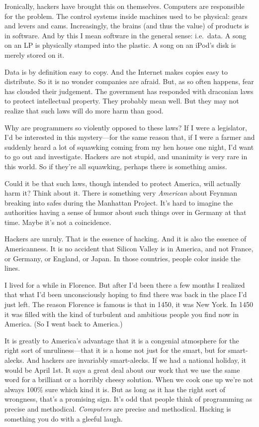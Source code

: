 Ironically, hackers have brought this on themselves. Computers are
responsible for the problem. The control systems inside machines used to
be physical: gears and levers and cams. Increasingly, the brains (and
thus the value) of products is in software. And by this I mean software
in the general sense: i.e.~data. A song on an LP is physically stamped
into the plastic. A song on an iPod's disk is merely stored on it.

Data is by definition easy to copy. And the Internet makes copies easy
to distribute. So it is no wonder companies are afraid. But, as so often
happens, fear has clouded their judgement. The government has responded
with draconian laws to protect intellectual property. They probably mean
well. But they may not realize that such laws will do more harm than
good.

Why are programmers so violently opposed to these laws? If I were a
legislator, I'd be interested in this mystery---for the same reason
that, if I were a farmer and suddenly heard a lot of squawking coming
from my hen house one night, I'd want to go out and investigate. Hackers
are not stupid, and unanimity is very rare in this world. So if they're
all squawking, perhaps there is something amiss.

Could it be that such laws, though intended to protect America, will
actually harm it? Think about it. There is something very
\emph{American} about Feynman breaking into safes during the Manhattan
Project. It's hard to imagine the authorities having a sense of humor
about such things over in Germany at that time. Maybe it's not a
coincidence.

Hackers are unruly. That is the essence of hacking. And it is also the
essence of Americanness. It is no accident that Silicon Valley is in
America, and not France, or Germany, or England, or Japan. In those
countries, people color inside the lines.

I lived for a while in Florence. But after I'd been there a few months I
realized that what I'd been unconsciously hoping to find there was back
in the place I'd just left. The reason Florence is famous is that in
1450, it was New York. In 1450 it was filled with the kind of turbulent
and ambitious people you find now in America. (So I went back to
America.)

It is greatly to America's advantage that it is a congenial atmosphere
for the right sort of unruliness---that it is a home not just for the
smart, but for smart-alecks. And hackers are invariably smart-alecks. If
we had a national holiday, it would be April 1st. It says a great deal
about our work that we use the same word for a brilliant or a horribly
cheesy solution. When we cook one up we're not always 100\% sure which
kind it is. But as long as it has the right sort of wrongness, that's a
promising sign. It's odd that people think of programming as precise and
methodical. \emph{Computers} are precise and methodical. Hacking is
something you do with a gleeful laugh.

